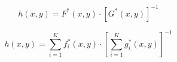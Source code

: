 \documentclass[../main.tex]{subfiles}%
\begin{document}
%
    \Xequation%
    \begin{equation*}%
        h(x,y) = F^{*}(x,y) \cdot [G^{*}(x,y)]^{-1}
    \end{equation*}%
    \par%
    \begin{equation}%
        h(x,y) =%
        \sum^{K}_{i=1}%
        f^{*}_{i}(x,y)%
        \cdot%
        \left[%
        \sum^{K}_{i=1}%
        g^{*}_{i}(x,y)%
        \right]^{-1}%
        \label{eq:mosaic-stitch-composite}%
    \end{equation}%
\end{document}
